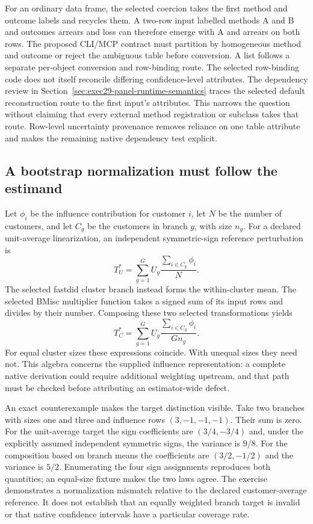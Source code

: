 For an ordinary data frame, the selected coercion takes the first method and outcome labels and recycles them. A two-row input labelled methods A and B and outcomes arrears and loss can therefore emerge with A and arrears on both rows. The proposed CLI/MCP contract must partition by homogeneous method and outcome or reject the ambiguous table before conversion. A list follows a separate per-object conversion and row-binding route. The selected row-binding code does not itself reconcile differing confidence-level attributes. The dependency review in Section~\ref{sec:exec29-panel-runtime-semantics} traces the selected default reconstruction route to the first input's attributes. This narrows the question without claiming that every external method registration or subclass takes that route. Row-level uncertainty provenance removes reliance on one table attribute and makes the remaining native dependency test explicit.~\citep{exec29_panel_inference_sources,exec29_panel_inference_reference}

\subsection{A bootstrap normalization must follow the estimand}

Let $\phi_i$ be the influence contribution for customer $i$, let $N$ be the number of customers, and let $C_g$ be the customers in branch $g$, with size $n_g$. For a declared unit-average linearization, an independent symmetric-sign reference perturbation is
\[
 T_U^*=\sum_{g=1}^{G}U_g\frac{\sum_{i\in C_g}\phi_i}{N}.
\]
The selected fastdid cluster branch instead forms the within-cluster mean. The selected BMisc multiplier function takes a signed sum of its input rows and divides by their number. Composing these two selected transformations yields
\[
 T_C^*=\sum_{g=1}^{G}U_g\frac{\sum_{i\in C_g}\phi_i}{G n_g}.
\]
For equal cluster sizes these expressions coincide. With unequal sizes they need not. This algebra concerns the supplied influence representation: a complete native derivation could require additional weighting upstream, and that path must be checked before attributing an estimator-wide defect.~\citep{exec28_panel_delegates,exec29_panel_inference_sources}

An exact counterexample makes the target distinction visible. Take two branches with sizes one and three and influence rows $(3,-1,-1,-1)$. Their sum is zero. For the unit-average target the sign coefficients are $(3/4,-3/4)$ and, under the explicitly assumed independent symmetric signs, the variance is $9/8$. For the composition based on branch means the coefficients are $(3/2,-1/2)$ and the variance is $5/2$. Enumerating the four sign assignments reproduces both quantities; an equal-size fixture makes the two laws agree. The exercise demonstrates a normalization mismatch relative to the declared customer-average reference. It does not establish that an equally weighted branch target is invalid or that native confidence intervals have a particular coverage rate.~\citep{exec29_panel_inference_reference}


